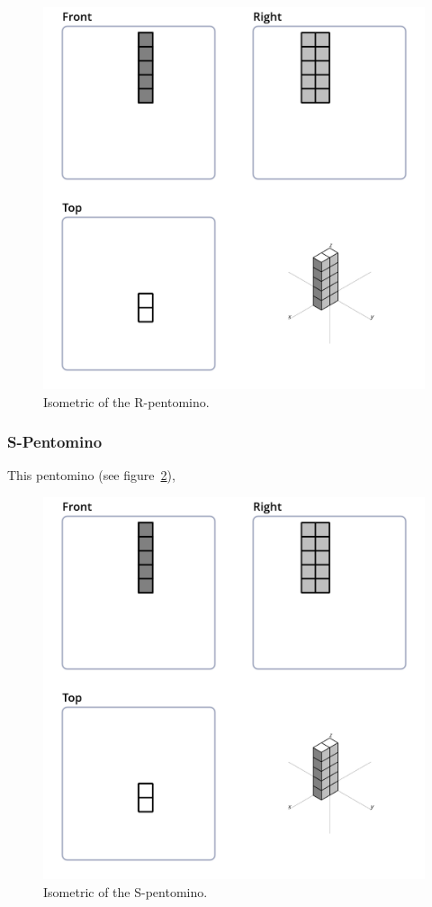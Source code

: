 \begin{figure}
	\centering
	\includegraphics[scale=0.3]{iso_diagrams/o.png}
	\caption{Isometric of the R-pentomino.}
  \label{fig:iso-pent-r}
\end{figure}
\subsubsection{S-Pentomino}
This pentomino (see figure~\ref{fig:iso-pent-s}),


\begin{figure}
	\centering
	\includegraphics[scale=0.3]{iso_diagrams/o.png}
	\caption{Isometric of the S-pentomino.}
  \label{fig:iso-pent-s}
\end{figure}
